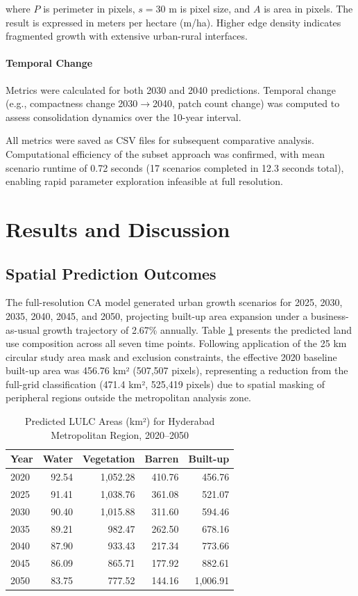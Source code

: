 \documentclass[12pt,a4paper]{article}
\begin{document}
where $P$ is perimeter in pixels, $s = 30$ m is pixel size, and $A$ is area in pixels. The result is expressed in meters per hectare (m/ha). Higher edge density indicates fragmented growth with extensive urban-rural interfaces.

\paragraph{Temporal Change}
Metrics were calculated for both 2030 and 2040 predictions. Temporal change (e.g., compactness change 2030$\rightarrow$2040, patch count change) was computed to assess consolidation dynamics over the 10-year interval.

All metrics were saved as CSV files for subsequent comparative analysis. Computational efficiency of the subset approach was confirmed, with mean scenario runtime of 0.72 seconds (17 scenarios completed in 12.3 seconds total), enabling rapid parameter exploration infeasible at full resolution.
\section{Results and Discussion}

\subsection{Spatial Prediction Outcomes}

The full-resolution CA model generated urban growth scenarios for 2025, 2030, 2035, 2040, 2045, and 2050, projecting built-up area expansion under a business-as-usual growth trajectory of 2.67\% annually. Table \ref{tab:spatial_results} presents the predicted land use composition across all seven time points. Following application of the 25 km circular study area mask and exclusion constraints, the effective 2020 baseline built-up area was 456.76 km² (507,507 pixels), representing a reduction from the full-grid classification (471.4 km², 525,419 pixels) due to spatial masking of peripheral regions outside the metropolitan analysis zone.

\begin{table}[H]
\caption{Predicted LULC Areas (km²) for Hyderabad Metropolitan Region, 2020--2050}
\label{tab:spatial_results}
\centering
\small
\renewcommand{\arraystretch}{1.2}
\begin{tabular}{lrrrr}
\toprule
\textbf{Year} & \textbf{Water} & \textbf{Vegetation} & \textbf{Barren} & \textbf{Built-up} \\
\midrule
2020 & 92.54 & 1,052.28 & 410.76 & 456.76 \\
2025 & 91.41 & 1,038.76 & 361.08 & 521.07 \\
2030 & 90.40 & 1,015.88 & 311.60 & 594.46 \\
2035 & 89.21 & 982.47 & 262.50 & 678.16 \\
2040 & 87.90 & 933.43 & 217.34 & 773.66 \\
2045 & 86.09 & 865.71 & 177.92 & 882.61 \\
2050 & 83.75 & 777.52 & 144.16 & 1,006.91 \\
\bottomrule
\end{tabular}
\end{table}
\end{document}
